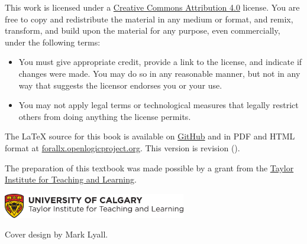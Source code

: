 \ifHTMLtarget\else
  \bigskip

  \noindent\footnotesize
\fi
This work is licensed under a \href{https://creativecommons.org/licenses/by/4.0/}{Creative Commons Attribution 4.0} license.
You are free to copy and redistribute the material in any medium or format, and  remix, transform, and build upon the material for any purpose, even commercially, under the following terms:
\begin{itemize}
\item You must give appropriate credit, provide a link to the license, and indicate if changes were made. You may do so in any reasonable manner, but not in any way that suggests the licensor endorses you or your use.
\item You may not apply legal terms or technological measures that legally restrict others from doing anything the license permits.
\end{itemize}

\ifHTMLtarget\else
\vfil\normalsize\noindent
\fi
The \LaTeX{} source for this book is available on
\href{https://github.com/rzach/forallx-yyc/}{GitHub} and in PDF and
HTML format at
\href{https://forallx.openlogicproject.org}{forallx.openlogicproject.org}.
This version is revision \gitAbbrevHash{}
(\gitAuthorDate).

\bigskip
\noindent
The preparation of this textbook was made possible by a grant from the \href{https://taylorinstitute.ucalgary.ca/}{Taylor Institute for Teaching and Learning}.

\bigskip
\noindent
\href{https://taylorinstitute.ucalgary.ca/}{\includegraphics[width=8cm]{assets/ti-color}}

\ifHTMLtarget\else
\bigskip
\noindent Cover design by Mark Lyall.
\fi
